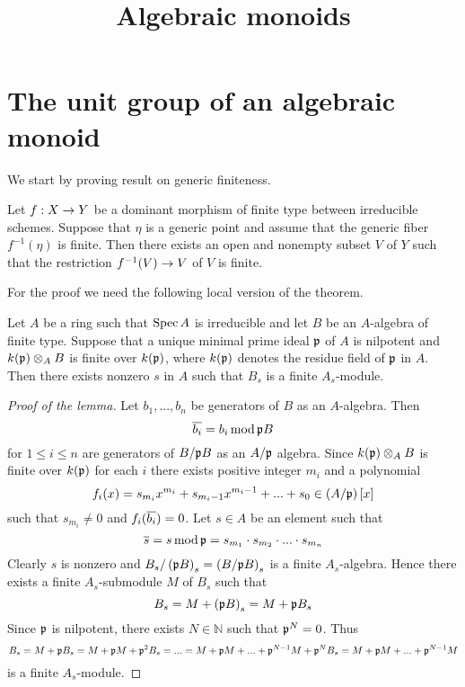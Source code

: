 



\title{Algebraic monoids}
\date{}
\maketitle

\section{The unit group of an algebraic monoid}
\noindent
We start by proving result on generic finiteness.

\begin{theorem}\label{theorem:generically_finite_morphisms_are_finite_on_some_neighborhood}
Let $f:X\rightarrow Y$ be a dominant morphism of finite type between irreducible schemes. Suppose that $\eta$ is a generic point and assume that the generic fiber $f^{-1}(\eta)$ is finite. Then there exists an open and nonempty subset $V$ of $Y$ such that the restriction $f^{-1}(V)\rightarrow V$ of $V$ is finite.
\end{theorem}
\noindent
For the proof we need the following local version of the theorem.

\begin{lemma}\label{lemma:generically_finite_means_finite_on_some_neighborhood_local_version}
Let $A$ be a ring such that $\mathrm{Spec}\, A$ is irreducible and let $B$ be an $A$-algebra of finite type. Suppose that a unique minimal prime ideal $\mathfrak{p}$ of $A$ is nilpotent and $k(\mathfrak{p})\otimes_AB$ is finite over $k(\mathfrak{p})$, where $k(\mathfrak{p})$ denotes the residue field of $\mathfrak{p}$ in $A$. Then there exists nonzero $s$ in $A$ such that $B_s$ is a finite $A_s$-module.
\end{lemma}
\begin{proof}[Proof of the lemma]
Let $b_1,...,b_n$ be generators of $B$ as an $A$-algebra. Then
$$\overline{b_i} = b_i\,\mathrm{mod}\,\mathfrak{p}B$$
for $1 \leq i\leq n$ are generators of $B/\mathfrak{p}B$ as an $A/\mathfrak{p}$ algebra. Since $k(\mathfrak{p})\otimes_AB$ is finite over $k(\mathfrak{p})$ for each $i$ there exists positive integer $m_i$ and a polynomial
$$f_i(x) = s_{m_i}x^{m_i}+s_{m_i-1}x^{m_i-1}+...+s_0\in \left(A/\mathfrak{p}\right)[x]$$
such that $s_{m_i}\neq 0$ and $f_i(\overline{b_i}) = 0$. Let $s\in A$ be an element such that
$$\overline{s} = s\,\mathrm{mod}\,\mathfrak{p} = s_{m_1}\cdot s_{m_2}\cdot ...\cdot s_{m_n}$$
Clearly $s$ is nonzero and $B_s/\left(\mathfrak{p}B\right)_s = \left(B/\mathfrak{p}B\right)_s$ is a finite $A_s$-algebra. Hence there exists a finite $A_s$-submodule $M$ of $B_s$ such that
$$B_s = M + \left(\mathfrak{p}B\right)_s = M + \mathfrak{p}B_s$$
Since $\mathfrak{p}$ is nilpotent, there exists $N\in \mathbb{N}$ such that $\mathfrak{p}^N = 0$. Thus
$$B_s = M + \mathfrak{p}B_s = M + \mathfrak{p}M + \mathfrak{p}^2B_s = ... = M + \mathfrak{p}M + ... + \mathfrak{p}^{N-1}M + \mathfrak{p}^NB_s = M + \mathfrak{p}M + ... + \mathfrak{p}^{N-1}M$$
is a finite $A_s$-module.
\end{proof}

